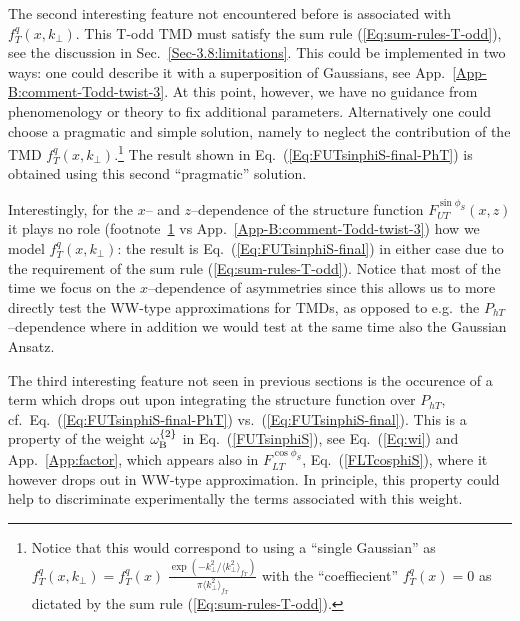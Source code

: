 \documentclass[a4paper,11pt]{article}
\newcommand{\la}{\langle}
\newcommand{\ra}{\rangle}
\def\Phperp{P_{hT}}
\def\kperp{k_\perp}
\begin{document}
The second interesting feature not encountered before is 
associated with $f_T^q(x,\kperp)$. This T-odd TMD must 
satisfy the sum rule (\ref{Eq:sum-rules-T-odd}), see the
discussion in Sec.~\ref{Sec-3.8:limitations}. This could be
implemented in two ways: one could describe it with a superposition 
of Gaussians, see App.~\ref{App-B:comment-Todd-twist-3}.
At this point, however, we have no guidance from phenomenology or theory 
to fix additional parameters. Alternatively one could choose a pragmatic 
and simple solution, namely to neglect the contribution of the TMD
$f_T^q(x,\kperp)$.\footnote{\label{Footnote:fT-single-Gauss} Notice 
	that this would correspond to using a ``single Gaussian'' as 
	$f_T^q(x,\kperp) = f_T^q(x)\;
	\frac{\exp(-\kperp^2/\la\kperp^2\ra_{f_T}^{ })}
	{\pi\la\kperp^2\ra_{f_T}^{ }}$
	with the ``coeffiecient'' $f_T^q(x)=0$ as dictated 
	by the sum rule (\ref{Eq:sum-rules-T-odd}).}
The result shown in Eq.~(\ref{Eq:FUTsinphiS-final-PhT})
is obtained using this second ``pragmatic'' solution.

Interestingly, for the $x$-- and $z$--dependence of the
structure function $F_{UT}^{\sin\phi_S}(x,z)$ it plays no role
(footnote~\ref{Footnote:fT-single-Gauss} 
vs App.~\ref{App-B:comment-Todd-twist-3}) how we model $f_T^q(x,\kperp)$: 
the result is Eq.~(\ref{Eq:FUTsinphiS-final}) in either case due to the 
requirement of the sum rule (\ref{Eq:sum-rules-T-odd}).
Notice that most of the time we focus on the $x$--dependence of 
asymmetries since this allows us to more directly test the WW-type 
approximations for TMDs, as opposed to e.g.\ the $P_{hT}$--dependence 
where in addition we would test at the same time also the Gaussian Ansatz.

The third interesting feature not seen in
previous sections is the occurence of a term which
drops out upon integrating the structure function over $\Phperp$, cf.\ 
Eq.~(\ref{Eq:FUTsinphiS-final-PhT}) vs.\ (\ref{Eq:FUTsinphiS-final}).
This is a property of the weight $\omega^{\{2\}}_{\rm B}$ 
in Eq.~(\ref{FUTsinphiS}),
see Eq.~(\ref{Eq:wi}) and App.~\ref{App:factor}, which appears
also in $F_{LT}^{\cos\phi_S}$, Eq.~(\ref{FLTcosphiS}), where it however drops
out in WW-type approximation. In principle, this property could  help to 
discriminate experimentally the terms associated with this weight.
\end{document}
